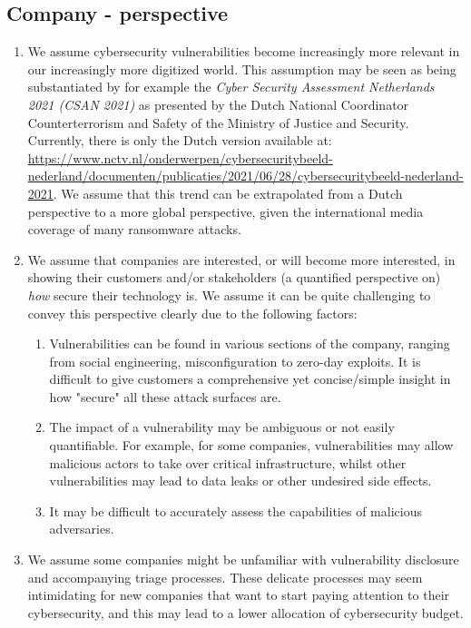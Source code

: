 \subsection{Company - perspective}
\begin{enumerate}
	\item We assume cybersecurity vulnerabilities become increasingly more relevant in our increasingly more digitized world. This assumption may be seen as being substantiated by for example the \textit{Cyber Security Assessment Netherlands 2021 (CSAN 2021)} as presented by the Dutch National Coordinator Counterterrorism and Safety of the Ministry of Justice and Security. Currently, there is only the Dutch version available at: \url{https://www.nctv.nl/onderwerpen/cybersecuritybeeld-nederland/documenten/publicaties/2021/06/28/cybersecuritybeeld-nederland-2021}. We assume that this trend can be extrapolated from a Dutch perspective to a more global perspective, given the international media coverage of many ransomware attacks.
	\item We assume that companies are interested, or will become more interested, in showing their customers and/or stakeholders (a quantified perspective on) \textit{how} secure their technology is. We assume it can be quite challenging to convey this perspective clearly due to the following factors:
	\begin{enumerate}
		\item Vulnerabilities can be found in various sections of the company, ranging from social engineering, misconfiguration to zero-day exploits. It is difficult to give customers a comprehensive yet concise/simple insight in how "secure" all these attack surfaces are.
		\item The impact of a vulnerability may be ambiguous or not easily quantifiable. For example, for some companies, vulnerabilities may allow malicious actors to take over critical infrastructure, whilst other vulnerabilities may lead to data leaks or other undesired side effects.
		\item It may be difficult to accurately assess the capabilities of malicious adversaries.
	\end{enumerate}
	\item We assume some companies might be unfamiliar with vulnerability disclosure and accompanying triage processes. These delicate processes may seem intimidating for new companies that want to start paying attention to their cybersecurity, and this may lead to a lower allocation of cybersecurity budget.
\end{enumerate}